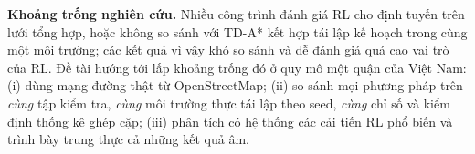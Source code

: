 \textbf{Khoảng trống nghiên cứu.} Nhiều công trình đánh giá RL cho định tuyến trên lưới tổng hợp, hoặc không so sánh với
TD-A* kết hợp tái lập kế hoạch trong cùng một môi trường; các kết quả vì vậy khó so sánh và dễ đánh giá quá cao vai trò
của RL. Đề tài hướng tới lấp khoảng trống đó ở quy mô một quận của Việt Nam: (i) dùng mạng đường thật từ OpenStreetMap;
(ii) so sánh mọi phương pháp trên \emph{cùng} tập kiểm tra, \emph{cùng} môi trường thực tái lập theo seed, \emph{cùng}
chỉ số và kiểm định thống kê ghép cặp; (iii) phân tích có hệ thống các cải tiến RL phổ biến và trình bày trung thực cả
những kết quả âm.
